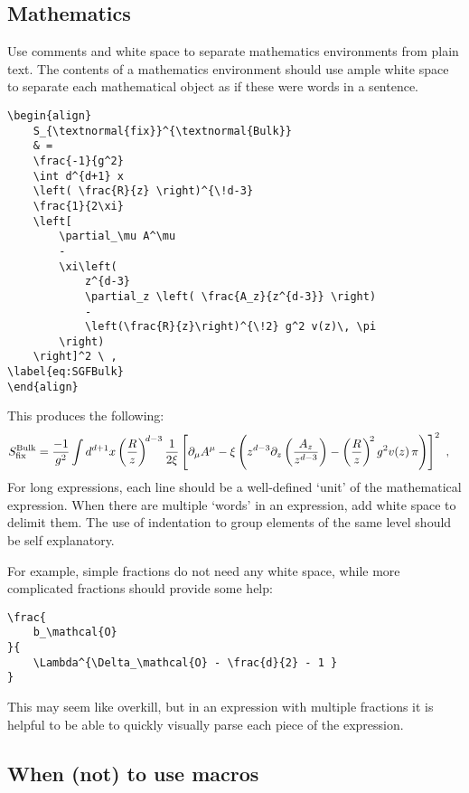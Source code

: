 \subsection{Mathematics}

Use comments and white space to separate mathematics environments from plain text.
% 
The contents of a mathematics environment should use ample white space to separate each mathematical object as if these were words in a sentence.
% 
\begin{lstlisting}[style=latexstyle]
\begin{align}
	S_{\textnormal{fix}}^{\textnormal{Bulk}}
	& =
	\frac{-1}{g^2} 
	\int d^{d+1} x  
	\left( \frac{R}{z} \right)^{\!d-3}
	\frac{1}{2\xi}
	\left[
	    \partial_\mu A^\mu
	    -
	    \xi\left( 
	        z^{d-3} 
	        \partial_z \left( \frac{A_z}{z^{d-3}} \right)
	        -
	        \left(\frac{R}{z}\right)^{\!2} g^2 v(z)\, \pi
	    \right)
	\right]^2 \ ,
\label{eq:SGFBulk}
\end{align}
\end{lstlisting}
% 
This produces the following:
\begin{align}
	S_{\textnormal{fix}}^{\textnormal{Bulk}}
	& =
	\frac{-1}{g^2} 
	\int d^{d+1} x  
	\left( \frac{R}{z} \right)^{\!d-3}\frac{1}{2\xi}
	\left[
	    \partial_\mu A^\mu
	    -
	    \xi\left( 
	        z^{d-3} \partial_z \left(\frac{A_z}{z^{d-3}}\right)
	        -
	        \left(\frac{R}{z}\right)^{\!2} g^2 v(z)\, \pi
	    \right)
	\right]^2 \ ,
\end{align}
For long expressions, each line should be a well-defined `unit' of the mathematical expression. When there are multiple `words' in an expression, add white space to delimit them. The use of indentation to group elements of the same level should be self explanatory.

For example, simple fractions do not need any white space, while more complicated fractions should provide some help:
% 
\begin{lstlisting}[style=latexstyle]
\frac{ 
	b_\mathcal{O}
}{
	\Lambda^{\Delta_\mathcal{O} - \frac{d}{2} - 1 }
} 
\end{lstlisting}
% 
This may seem like overkill, but in an expression with multiple fractions it is helpful to be able to quickly visually parse each piece of the expression.


\subsection{When (not) to use macros}

